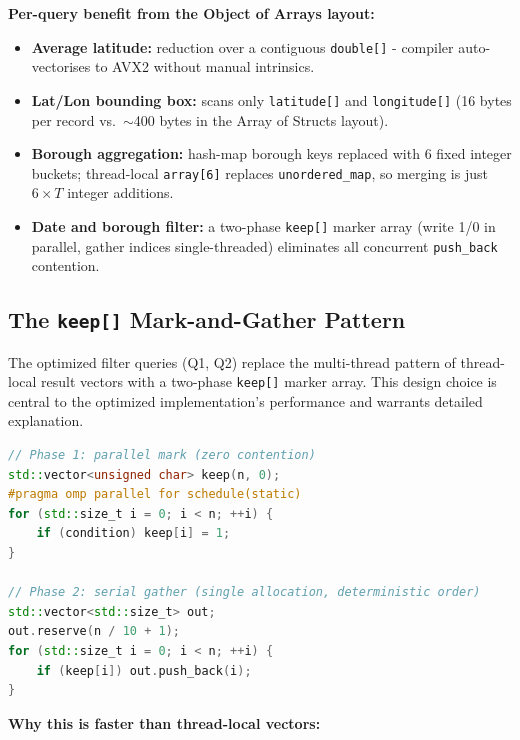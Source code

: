 \documentclass[12pt]{article}
\begin{document}
\noindent\textbf{Per-query benefit from the Object of Arrays layout:}
\begin{itemize}
  \item \textbf{Average latitude:} reduction over a contiguous
    \texttt{double[]} - compiler auto-vectorises to AVX2 without manual
    intrinsics.
  \item \textbf{Lat/Lon bounding box:} scans only \texttt{latitude[]} and
    \texttt{longitude[]} (16 bytes per record vs.\ $\sim$400 bytes in the
    Array of Structs layout).
  \item \textbf{Borough aggregation:} hash-map borough keys replaced with
    6 fixed integer buckets; thread-local \texttt{array[6]} replaces
    \texttt{unordered\_map}, so merging is just $6 \times T$ integer additions.
  \item \textbf{Date and borough filter:} a two-phase \texttt{keep[]} marker
    array (write 1/0 in parallel, gather indices single-threaded) eliminates
    all concurrent \texttt{push\_back} contention.
\end{itemize}

\subsection{The \texttt{keep[]} Mark-and-Gather Pattern}

The optimized filter queries (Q1, Q2) replace the multi-thread pattern of
thread-local result vectors with a two-phase \texttt{keep[]} marker array.
This design choice is central to the optimized implementation's performance
and warrants detailed explanation.

\begin{lstlisting}[language=C++]
// Phase 1: parallel mark (zero contention)
std::vector<unsigned char> keep(n, 0);
#pragma omp parallel for schedule(static)
for (std::size_t i = 0; i < n; ++i) {
    if (condition) keep[i] = 1;
}

// Phase 2: serial gather (single allocation, deterministic order)
std::vector<std::size_t> out;
out.reserve(n / 10 + 1);
for (std::size_t i = 0; i < n; ++i) {
    if (keep[i]) out.push_back(i);
}
\end{lstlisting}

\noindent\textbf{Why this is faster than thread-local vectors:}
\end{document}

